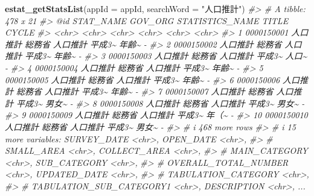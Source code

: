 \documentclass[
  xelatex, ja=standard]{bxjsbook}
\newenvironment{Shaded}{\begin{snugshade}}{\end{snugshade}}
\newcommand{\AttributeTok}[1]{\textcolor[rgb]{0.13,0.29,0.53}{#1}}
\newcommand{\CommentTok}[1]{\textcolor[rgb]{0.56,0.35,0.01}{\textit{#1}}}
\newcommand{\FunctionTok}[1]{\textcolor[rgb]{0.13,0.29,0.53}{\textbf{#1}}}
\newcommand{\NormalTok}[1]{#1}
\newcommand{\StringTok}[1]{\textcolor[rgb]{0.31,0.60,0.02}{#1}}
\theoremstyle{definition}
\theoremstyle{definition}
\theoremstyle{definition}
\theoremstyle{definition}
\theoremstyle{remark}
\begin{document}
\begin{Shaded}
\begin{Highlighting}[]
\FunctionTok{estat\_getStatsList}\NormalTok{(}\AttributeTok{appId =}\NormalTok{ appId, }\AttributeTok{searchWord =} \StringTok{"人口推計"}\NormalTok{)}
\CommentTok{\#\textgreater{} \# A tibble: 478 x 21}
\CommentTok{\#\textgreater{}    \textasciigrave{}@id\textasciigrave{}      STAT\_NAME GOV\_ORG STATISTICS\_NAME TITLE CYCLE}
\CommentTok{\#\textgreater{}    \textless{}chr\textgreater{}      \textless{}chr\textgreater{}     \textless{}chr\textgreater{}   \textless{}chr\textgreater{}           \textless{}chr\textgreater{} \textless{}chr\textgreater{}}
\CommentTok{\#\textgreater{}  1 0000150001 人口推計  総務省  人口推計 平成3\textasciitilde{} 年齢\textasciitilde{} {-}    }
\CommentTok{\#\textgreater{}  2 0000150002 人口推計  総務省  人口推計 平成3\textasciitilde{} 年齢\textasciitilde{} {-}    }
\CommentTok{\#\textgreater{}  3 0000150003 人口推計  総務省  人口推計 平成3\textasciitilde{} 人口\textasciitilde{} {-}    }
\CommentTok{\#\textgreater{}  4 0000150004 人口推計  総務省  人口推計 平成3\textasciitilde{} 年齢\textasciitilde{} {-}    }
\CommentTok{\#\textgreater{}  5 0000150005 人口推計  総務省  人口推計 平成3\textasciitilde{} 年齢\textasciitilde{} {-}    }
\CommentTok{\#\textgreater{}  6 0000150006 人口推計  総務省  人口推計 平成3\textasciitilde{} 年齢\textasciitilde{} {-}    }
\CommentTok{\#\textgreater{}  7 0000150007 人口推計  総務省  人口推計 平成3\textasciitilde{} 男女\textasciitilde{} {-}    }
\CommentTok{\#\textgreater{}  8 0000150008 人口推計  総務省  人口推計 平成3\textasciitilde{} 男女\textasciitilde{} {-}    }
\CommentTok{\#\textgreater{}  9 0000150009 人口推計  総務省  人口推計 平成3\textasciitilde{} 年（\textasciitilde{} {-}    }
\CommentTok{\#\textgreater{} 10 0000150010 人口推計  総務省  人口推計 平成3\textasciitilde{} 男女\textasciitilde{} {-}    }
\CommentTok{\#\textgreater{} \# i 468 more rows}
\CommentTok{\#\textgreater{} \# i 15 more variables: SURVEY\_DATE \textless{}chr\textgreater{}, OPEN\_DATE \textless{}chr\textgreater{},}
\CommentTok{\#\textgreater{} \#   SMALL\_AREA \textless{}chr\textgreater{}, COLLECT\_AREA \textless{}chr\textgreater{},}
\CommentTok{\#\textgreater{} \#   MAIN\_CATEGORY \textless{}chr\textgreater{}, SUB\_CATEGORY \textless{}chr\textgreater{},}
\CommentTok{\#\textgreater{} \#   OVERALL\_TOTAL\_NUMBER \textless{}chr\textgreater{}, UPDATED\_DATE \textless{}chr\textgreater{},}
\CommentTok{\#\textgreater{} \#   TABULATION\_CATEGORY \textless{}chr\textgreater{},}
\CommentTok{\#\textgreater{} \#   TABULATION\_SUB\_CATEGORY1 \textless{}chr\textgreater{}, DESCRIPTION \textless{}chr\textgreater{}, ...}
\end{Highlighting}
\end{Shaded}
\end{document}
